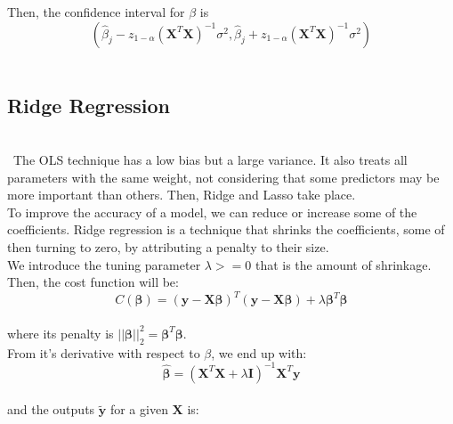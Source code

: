 \documentclass{article}
\begin{document}
Then, the confidence interval for $\beta$ is\\

\begin{equation}
\label{eq6}
(\hat{\beta}_j-z_{1-\alpha}(\textbf{X}^T\textbf{X})^{-1}\sigma^2, \hat{\beta}_j+ z_{1-\alpha}(\textbf{X}^T\textbf{X})^{-1}\sigma^2)
\end{equation}\\

\subsection{Ridge Regression}\\

\quad \, The OLS technique has a low bias but a large variance. It also treats all parameters with the same weight, not considering that some predictors may be more important than others. Then, Ridge and Lasso take place.\\

To improve the accuracy of a model, we can reduce or increase some of the coefficients. Ridge regression is a technique that shrinks the coefficients, some of then turning to zero, by attributing a penalty to their size.\\

We introduce the tuning parameter $\lambda>=0$ that is the amount of shrinkage. Then, the cost function will be:\\

$$C(\boldsymbol{\beta}) = (\boldsymbol{y} - \boldsymbol{X\beta})^T(\boldsymbol{y} - \boldsymbol{X\beta}) + \lambda \boldsymbol{\beta}^T\boldsymbol{\beta}$$\\

\noindent where its penalty is $||\boldsymbol{\beta}||_2^2 = \boldsymbol{\beta}^T\boldsymbol{\beta}$.\\

From it's derivative with respect to $\beta$, we end up with:\\

\begin{equation}
\label{eq7}
\boldsymbol{\hat\beta} = ( \boldsymbol{X}^T\boldsymbol{X} + \lambda \boldsymbol{I} )^{-1} \boldsymbol{X}^T \boldsymbol{y}
\end{equation}\\

\noindent and the outputs $\boldsymbol{\tilde{y}}$ for a given  $\boldsymbol{X}$ is:\\
\end{document}
